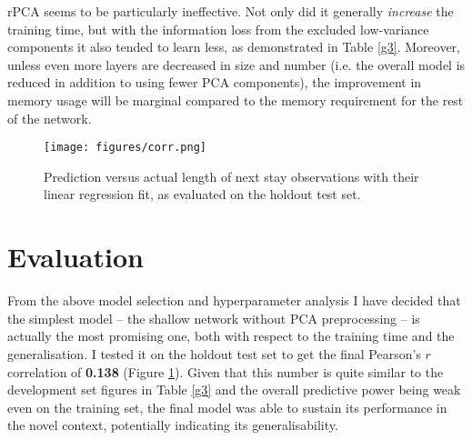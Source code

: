 \documentclass[10pt, twocolumn]{article}
\begin{document}
rPCA seems to be particularly ineffective. Not only did it generally \textit{increase} the training time, but with the information loss from the excluded low-variance components it also tended to learn less, as demonstrated in Table \ref{g3}. Moreover, unless even more layers are decreased in size and number (i.e. the overall model is reduced in addition to using fewer PCA components), the improvement in memory usage will be marginal compared to the memory requirement for the rest of the network. 

\begin{figure}[htb!]
	\centering
	\texttt{[image: figures/corr.png]}
	\caption{Prediction versus actual length of next stay observations with their linear regression fit, as evaluated on the holdout test set.}\label{corr}
\end{figure}

\section{Evaluation}

From the above model selection and hyperparameter analysis I have decided that the simplest model – the shallow network without PCA preprocessing – is actually the most promising one, both with respect to the training time and the generalisation. I tested it on the holdout test set to get the final Pearson's $r$ correlation of \textbf{0.138} (Figure \ref{corr}). Given that this number is quite similar to the development set figures in Table \ref{g3} and the overall predictive power being weak even on the training set, the final model was able to sustain its performance in the novel context, potentially indicating its generalisability.

\medskip
 


\end{document}

